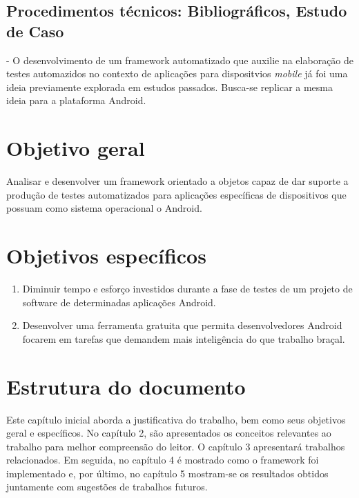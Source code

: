 \documentclass[
    12pt,       %
    openright,      %
    twoside,      %
    a4paper,      %
    english,      %
    french,       %
    spanish,      %
    brazil,       %
    ]{abntex2}
\begin{document}
    \subsection{Procedimentos técnicos: Bibliográficos, Estudo de Caso} - O desenvolvimento
    de um framework automatizado que auxilie na elaboração de testes automazidos no
    contexto de aplicações para dispositvios \textit{mobile} já foi uma ideia previamente
    explorada em estudos passados. Busca-se replicar a mesma ideia para a plataforma
    Android.

  \section{Objetivo geral}
      Analisar e desenvolver um framework orientado a objetos capaz de dar suporte a produção
      de testes automatizados para aplicações específicas de dispositivos que possuam como
      sistema operacional o Android.

  \section{Objetivos específicos}
  \begin{enumerate}
      \item Diminuir tempo e esforço investidos durante a fase de testes de um projeto de software
            de determinadas aplicações Android.
      \item Desenvolver uma ferramenta gratuita que permita desenvolvedores Android focarem
            em tarefas que demandem mais inteligência do que trabalho braçal.
  \end{enumerate}

  \section{Estrutura do documento}
      Este capítulo inicial aborda a justificativa do trabalho, bem como seus
      objetivos geral e específicos. No capítulo 2, são apresentados os
      conceitos relevantes ao trabalho para melhor compreensão do leitor.
      O capítulo 3 apresentará trabalhos relacionados. Em seguida,
      no capítulo 4 é mostrado como o framework foi implementado e, por
      último, no capítulo 5 mostram-se os resultados obtidos juntamente com
      sugestões de trabalhos futuros.
\end{document}
